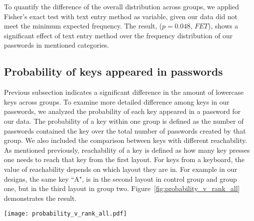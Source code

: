 \documentclass[conference]{IEEEtran}
\begin{document}
To quantify the difference of the overall distribution across groups, we applied Fisher's exact test with text entry method as variable, given our data did not meet the minimum expected frequency. The result, ($p=0.048$, $FET$), shows a significant effect of text entry method over the frequency distribution of our passwords in mentioned categories. 



\subsection{Probability of keys appeared in passwords}

Previous subsection indicates a significant difference in the amount of lowercase keys across groups. To examine more detailed difference among keys in our passwords, we analyzed the probability of each key appeared in a password for our data. The probability of a key within one group is defined as the number of passwords contained the key over the total number of passwords created by that group. We also included the comparison between keys with different reachability. As mentioned previously, reachability of a key is defined as how many key presses one needs to reach that key from the first layout. For keys from a keyboard, the value of reachability depends on which layout they are in. For example in our designs, the same key ``A", is in the second layout in control group and group one, but in the third layout in group two. Figure~\ref{fig:probability_v_rank_all} demonstrates the result. 

\begin{figure*}[htbp]
\begin{center}
\texttt{[image: probability\_v\_rank\_all.pdf]}
\caption{\label{fig:probability_v_rank_all} The probabilities of keys across groups. Three graphs display the same set of data but use different group as \emph{baseline group}: control group (top), group one (middle), group two (bottom). In each graph, probability of each key across groups are plotted as dots. Vertical lines indicate the order of layouts (first, second, etc) based on that of \emph{baseline group}. Within each layout, the order of keys on x axis is ranked by probability of each key from the corresponding \emph{baseline group} Curve lines in each graph represents a non-linear fit to data of each group.} 
\vspace{-9pt}
\end{center}
\end{figure*}
\end{document}
